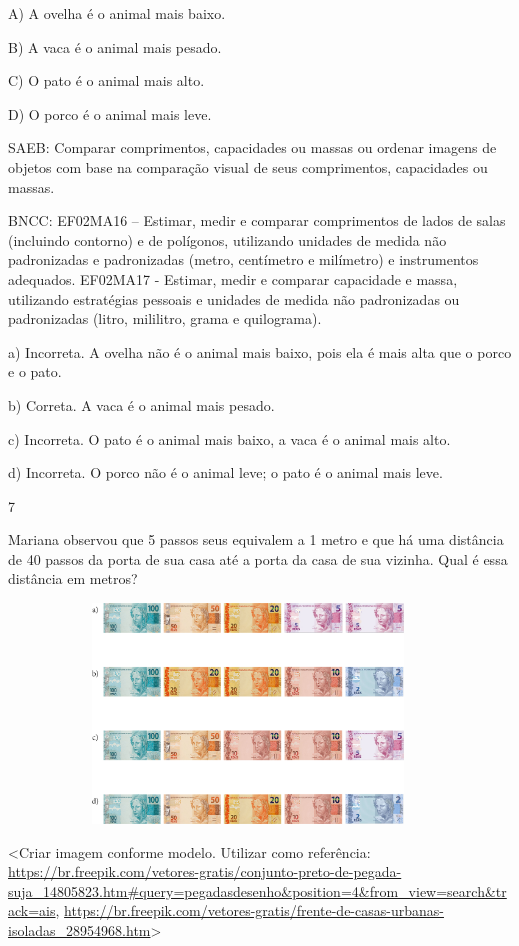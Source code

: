 \begin{escolha}
\begin{escolha}
{{{{A) A ovelha é o animal mais baixo.

B) A vaca é o animal mais pesado.

C) O pato é o animal mais alto.

D) O porco é o animal mais leve.

SAEB: Comparar comprimentos, capacidades ou massas ou ordenar
imagens de objetos com base na comparação visual de seus comprimentos,
capacidades ou massas.

BNCC: EF02MA16 -- Estimar, medir e comparar comprimentos de lados de
salas (incluindo contorno) e de polígonos, utilizando unidades de medida
não padronizadas e padronizadas (metro, centímetro e milímetro) e
instrumentos adequados. EF02MA17 - Estimar, medir e comparar capacidade
e massa, utilizando estratégias pessoais e unidades de medida não
padronizadas ou padronizadas (litro, mililitro, grama e quilograma).

a) Incorreta. A ovelha não é o animal mais baixo, pois ela é mais alta
que o porco e o pato.

b) Correta. A vaca é o animal mais pesado.

c) Incorreta. O pato é o animal mais baixo, a vaca é o animal mais alto.

d) Incorreta. O porco não é o animal leve; o pato é o animal mais leve.

\num{7}

Mariana observou que 5 passos seus equivalem a 1 metro e que há uma
distância de 40 passos da porta de sua casa até a porta da casa de sua vizinha. Qual é essa distância em metros?

\includegraphics[width=5.00000in,height=2.30208in]{media/image115.png}

\textless{}Criar imagem conforme modelo. Utilizar como referência:
\url{https://br.freepik.com/vetores-gratis/conjunto-preto-de-pegada-suja_14805823.htm\#query=pegadasdesenho\&position=4\&from_view=search\&track=ais},
\url{https://br.freepik.com/vetores-gratis/frente-de-casas-urbanas-isoladas_28954968.htm}\textgreater{}

}}}}
\end{escolha}
\end{escolha}
